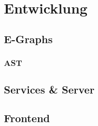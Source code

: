 \section{Entwicklung}\label{sec:entwicklung}

\subsection{E-Graphs}

\subsubsection{AST}

\subsection{Services \& Server}

\subsection{Frontend}